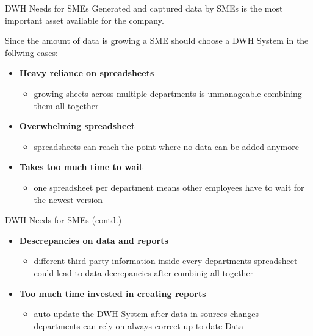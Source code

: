 \documentclass[aspectratio=169]{beamer}
\begin{document}
  \begin{frame}{DWH Needs for SMEs}
    Generated and captured data by SMEs is the most important asset available for the company.

Since the amount of data is growing a SME should choose a DWH System in the follwing cases:
    \begin{itemize}
      \item \textbf{Heavy reliance on spreadsheets}
      	\begin{itemize}
      	   \item growing sheets across multiple departments is unmanageable combining them all together
      	\end{itemize}
      \item \textbf{Overwhelming spreadsheet}
		\begin{itemize}
		   \item spreadsheets can reach the point where no data can be added anymore
      	\end{itemize}
      \item \textbf{Takes too much time to wait}
      	\begin{itemize}
      	   \item one spreadsheet per department means other employees have to wait for the newest version
      	\end{itemize}
    \end{itemize}
  \end{frame}
  
  \begin{frame}{DWH Needs for SMEs (contd.)}
    \begin{itemize}
      \item \textbf{Descrepancies on data and reports}
      	\begin{itemize}
      	   \item different third party information inside every departments spreadsheet could lead to data decrepancies after combinig all together
      	\end{itemize}
      \item \textbf{Too much time invested in creating reports}
        \begin{itemize}
      	   \item auto update the DWH System after data in sources changes - departments can rely on always correct up to date Data
      	\end{itemize}
    \end{itemize}
  \end{frame}
\end{document}
